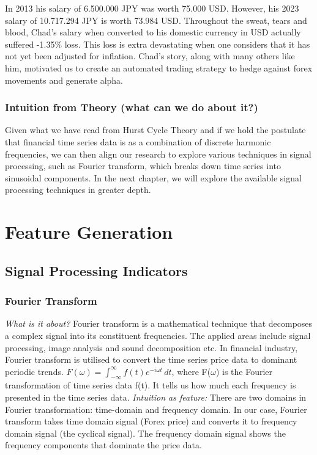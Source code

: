 \documentclass{article}
\begin{document}
\noindent In 2013 his salary of 6.500.000 JPY was worth 75.000 USD. However, his 2023 salary of 10.717.294 JPY is worth 73.984 USD. Throughout the sweat, tears and blood, Chad's salary when converted to his domestic currency in USD actually suffered -1.35\% loss. This loss is extra devastating when one considers that it has not yet been adjusted for inflation.
\newline
\newline
Chad's story, along with many others like him, motivated us to create an automated trading strategy to hedge against forex movements and generate alpha.
\newpage
\subsubsection{Intuition from Theory (what can we do about it?)}
Given what we have read from Hurst Cycle Theory and if we hold the postulate that financial time series data is as a combination of discrete harmonic frequencies, we can then align our research to explore various techniques in signal processing, such as Fourier transform, which breaks down time series into sinusoidal components. In the next chapter, we will explore the available signal processing techniques in greater depth.

\section{Feature Generation}

\subsection{Signal Processing Indicators}

\subsubsection{Fourier Transform}

\textit{What is it about?}
Fourier transform is a mathematical technique that decomposes a complex signal into its constituent frequencies. The applied areas include signal processing, image analysis and sound decomposition etc. In financial industry, Fourier transform is utilised to convert the time series price data to dominant periodic trends. 
\newline
\newline
\(F(\omega) = \int_{-\infty}^{\infty} f(t) e^{-i \omega t} \, dt\), where F(\(\omega\)) is the Fourier transformation of time series data f(t). It tells us how much each frequency is presented in the time series data.
\newline
\newline
\textit{Intuition as feature:}
There are two domains in Fourier transformation: time-domain and frequency domain. In our case, Fourier transform takes time domain signal (Forex price) and converts it to frequency domain signal (the cyclical signal). The frequency domain signal shows the frequency components that dominate the price data.
\newline
\end{document}
